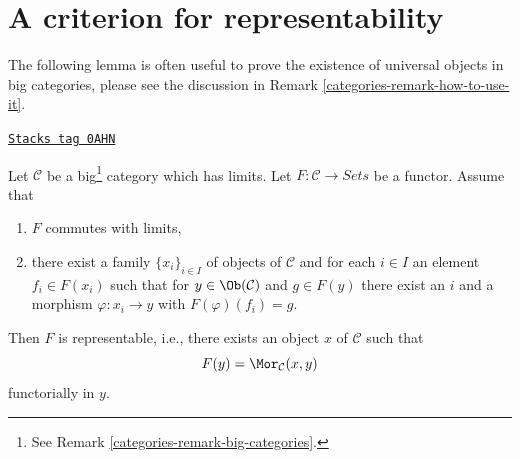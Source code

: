 \section{A criterion for representability}
\label{categories-section-representable}
The following lemma is often useful to prove the existence of
universal objects in big categories, please see the discussion
in Remark \ref{categories-remark-how-to-use-it}.

\begin{lemma}
\label{categories-lemma-a-version-of-brown}
\href{https://stacks.math.columbia.edu/tag/0AHN}{\texttt{Stacks tag 0AHN}}

Let $\mathcal{C}$ be a big\footnote{See Remark \ref{categories-remark-big-categories}.}
category which has limits. Let $F : \mathcal{C} \to \textit{Sets}$ be a
functor. Assume that
\begin{enumerate}
\item $F$ commutes with limits,
\item there exist a family $\{x_i\}_{i \in I}$ of objects of $\mathcal{C}$
and for each $i \in I$ an element $f_i \in F(x_i)$
such that for $y \in \Ob(\mathcal{C})$ and $g \in F(y)$
there exist an $i$ and a morphism $\varphi : x_i \to y$
with $F(\varphi)(f_i) = g$.
\end{enumerate}
Then $F$ is representable, i.e., there exists an object $x$
of $\mathcal{C}$ such that
$$
F(y) = \Mor_\mathcal{C}(x, y)
$$
functorially in $y$.
\end{lemma}

